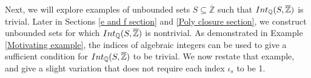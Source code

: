 \documentclass{article}
\theoremstyle{definition}\newtheorem{Def}[equation]{Definition}
\newtheorem{Rem}[equation]{Remark}
\theoremstyle{definition}\newtheorem{Ques}[equation]{Question}
\theoremstyle{definition}\newtheorem{Conj}[equation]{Conjecture}
\theoremstyle{definition}\newtheorem{Not}[equation]{Notation}
\newcommand{\Q}{\mathbb{Q}}
\newcommand{\oQ}{\overline{\Q}}
\newcommand{\oZ}{\overline{\Z}}
\newcommand{\Z}{\mathbb{Z}}
\newcommand{\Int}{\textnormal{Int}}
\newcommand{\IntQ}{\Int_{\Q}}
\newcommand{\rc}{ \color{red}}
\numberwithin{equation}{section}
\begin{document}





Next, we will explore examples of unbounded sets $S \subseteq \oZ$ such that $\IntQ(S,\oZ)$ is trivial. Later in Sections \ref{e and f section} and \ref{Poly closure section}, we construct unbounded sets for which $\IntQ(S,\oZ)$ is nontrivial. As demonstrated in Example \ref{Motivating example}, the indices of algebraic integers can be used to give a sufficient condition for $\IntQ(S,\oZ)$ to be trivial. We now restate that example, and give a slight variation that does not require each index $\iota_s$ to be 1.
\end{document}
